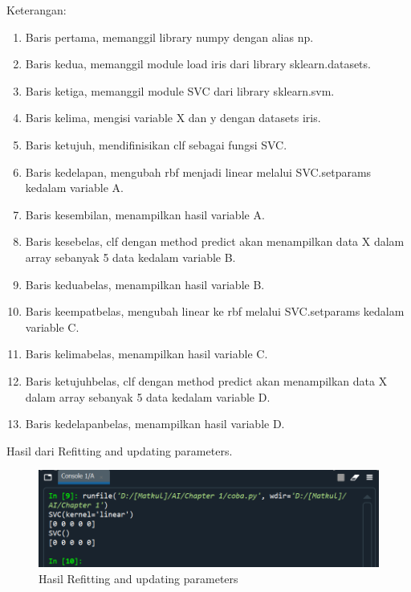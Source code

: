 \par Keterangan:
    \begin{enumerate}
        \item Baris pertama, memanggil library numpy dengan alias np.
        \item Baris kedua, memanggil module load iris dari library sklearn.datasets.
        \item Baris ketiga, memanggil module SVC dari library sklearn.svm.
        \item Baris kelima, mengisi variable X dan y dengan datasets iris.
        \item Baris ketujuh, mendifinisikan clf sebagai fungsi SVC.
        \item Baris kedelapan, mengubah rbf menjadi linear melalui SVC.setparams kedalam variable A.
        \item Baris kesembilan, menampilkan hasil variable A.
        \item Baris kesebelas, clf dengan method predict akan menampilkan data X dalam array sebanyak 5 data kedalam variable B.
        \item Baris keduabelas, menampilkan hasil variable B.
        \item Baris keempatbelas, mengubah linear ke rbf melalui SVC.setparams kedalam variable C.
        \item Baris kelimabelas, menampilkan hasil variable C.
        \item Baris ketujuhbelas, clf dengan method predict akan menampilkan data X dalam array sebanyak 5 data kedalam variable D.
        \item Baris kedelapanbelas, menampilkan hasil variable D.
    \end{enumerate}

\par Hasil dari Refitting and updating parameters.

    \begin{figure}[H]
    \centering
    \includegraphics[width=13cm]{figures/chapter1/25.PNG}
    \caption{Hasil Refitting and updating parameters}
    \end{figure}

